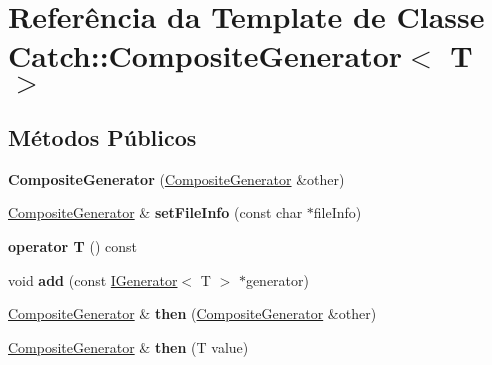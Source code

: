 \hypertarget{classCatch_1_1CompositeGenerator}{}\section{Referência da Template de Classe Catch\+:\+:Composite\+Generator$<$ T $>$}
\label{classCatch_1_1CompositeGenerator}
\subsection*{Métodos Públicos}
\begin{DoxyCompactItemize}
\item 
{\bfseries Composite\+Generator} (\hyperlink{classCatch_1_1CompositeGenerator}{Composite\+Generator} \&other)\hypertarget{classCatch_1_1CompositeGenerator_a21a7070a00e4a6fe021294c356692692}{}\label{classCatch_1_1CompositeGenerator_a21a7070a00e4a6fe021294c356692692}

\item 
\hyperlink{classCatch_1_1CompositeGenerator}{Composite\+Generator} \& {\bfseries set\+File\+Info} (const char $\ast$file\+Info)\hypertarget{classCatch_1_1CompositeGenerator_ac3c57cf4ca5472f440bf71e2936bcd4a}{}\label{classCatch_1_1CompositeGenerator_ac3c57cf4ca5472f440bf71e2936bcd4a}

\item 
{\bfseries operator T} () const \hypertarget{classCatch_1_1CompositeGenerator_aa3f627d84fb256df0404d19d7fd4b784}{}\label{classCatch_1_1CompositeGenerator_aa3f627d84fb256df0404d19d7fd4b784}

\item 
void {\bfseries add} (const \hyperlink{structCatch_1_1IGenerator}{I\+Generator}$<$ T $>$ $\ast$generator)\hypertarget{classCatch_1_1CompositeGenerator_af3774d42ad2d3453d089ca599efe0517}{}\label{classCatch_1_1CompositeGenerator_af3774d42ad2d3453d089ca599efe0517}

\item 
\hyperlink{classCatch_1_1CompositeGenerator}{Composite\+Generator} \& {\bfseries then} (\hyperlink{classCatch_1_1CompositeGenerator}{Composite\+Generator} \&other)\hypertarget{classCatch_1_1CompositeGenerator_a2e03f42df85cdd238aabd77a80b075d5}{}\label{classCatch_1_1CompositeGenerator_a2e03f42df85cdd238aabd77a80b075d5}

\item 
\hyperlink{classCatch_1_1CompositeGenerator}{Composite\+Generator} \& {\bfseries then} (T value)\hypertarget{classCatch_1_1CompositeGenerator_aefdc11bcfccdf07d2db5f0da3ed8758c}{}\label{classCatch_1_1CompositeGenerator_aefdc11bcfccdf07d2db5f0da3ed8758c}

\end{DoxyCompactItemize}


